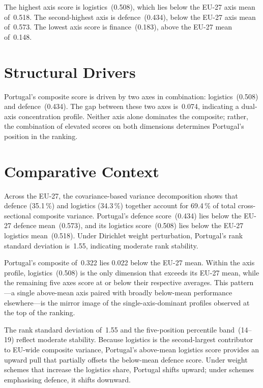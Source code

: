 \documentclass[12pt,a4paper]{article}
\begin{document}
The highest axis score is logistics~(0.508), which lies below the EU-27 axis mean of~0.518.  The second-highest axis is defence~(0.434), below the EU-27 axis mean of~0.573.  The lowest axis score is finance~(0.183), above the EU-27 mean of~0.148.


\section{Structural Drivers}
\label{sec:drivers}

\begin{sloppypar}
Portugal's composite score is driven by two axes in combination: logistics~(0.508) and defence~(0.434).  The gap between these two axes is~0.074, indicating a dual-axis concentration profile.  Neither axis alone dominates the composite; rather, the combination of elevated scores on both dimensions determines Portugal's position in the ranking.
\end{sloppypar}


\section{Comparative Context}
\label{sec:comparative}

Across the EU-27, the covariance-based variance decomposition shows that defence (35.1\,\%) and logistics (34.3\,\%) together account for 69.4\,\% of total cross-sectional composite variance.  Portugal's defence score~(0.434) lies below the EU-27 defence mean~(0.573), and its logistics score~(0.508) lies below the EU-27 logistics mean~(0.518).  Under Dirichlet weight perturbation, Portugal's rank standard deviation is~1.55, indicating moderate rank stability.



Portugal's composite of~0.322 lies 0.022 below the EU-27 mean.  Within the axis profile, logistics~(0.508) is the only dimension that exceeds its EU-27 mean, while the remaining five axes score at or below their respective averages.  This pattern---a single above-mean axis paired with broadly below-mean performance elsewhere---is the mirror image of the single-axis-dominant profiles observed at the top of the ranking.

The rank standard deviation of~1.55 and the five-position percentile band~(14--19) reflect moderate stability.  Because logistics is the second-largest contributor to EU-wide composite variance, Portugal's above-mean logistics score provides an upward pull that partially offsets the below-mean defence score.  Under weight schemes that increase the logistics share, Portugal shifts upward; under schemes emphasising defence, it shifts downward.
\end{document}
